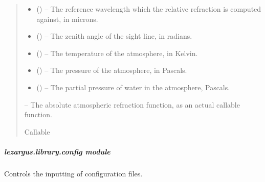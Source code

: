 \documentclass[letterpaper,11pt,english]{sphinxmanual}
\begin{document}
\begin{savenotes}
\begin{fulllineitems}
\begin{quote}
\begin{description}
\begin{itemize}
\item {} 
\sphinxAtStartPar
{} () – The reference wavelength which the relative refraction is computed
against, in microns.

\item {} 
\sphinxAtStartPar
{} () – The zenith angle of the sight line, in radians.

\item {} 
\sphinxAtStartPar
{} () – The temperature of the atmosphere, in Kelvin.

\item {} 
\sphinxAtStartPar
{} () – The pressure of the atmosphere, in Pascals.

\item {} 
\sphinxAtStartPar
{} () – The partial pressure of water in the atmosphere, Pascals.

\end{itemize}

\sphinxAtStartPar
{} – The absolute atmospheric refraction function, as an actual callable
function.

\sphinxAtStartPar
Callable

\end{description}\end{quote}

\end{fulllineitems}\end{savenotes}


\sphinxstepscope


\subparagraph{lezargus.library.config module}
\label{\detokenize{code/lezargus.library.config:module-lezargus.library.config}}\label{\detokenize{code/lezargus.library.config:lezargus-library-config-module}}\label{\detokenize{code/lezargus.library.config::doc}}
\sphinxAtStartPar
Controls the inputting of configuration files.
\end{document}
